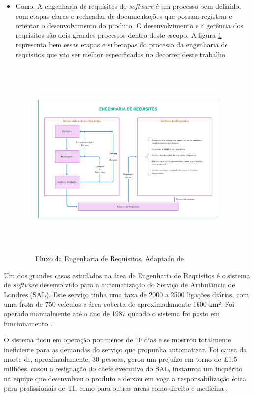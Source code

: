\begin{itemize}
    \item Como: A engenharia de requisitos de \textit{software} é um processo bem definido, com etapas claras e recheadas de documentações que possam registrar e orientar o desenvolvimento do produto. O desenvolvimento e a gerência dos requisitos são dois grandes processos dentro deste escopo. A figura \ref{eng_req_flux} representa bem essas etapas e subetapas do processo da engenharia de requisitos que vão ser melhor especificadas no decorrer deste trabalho.
    
    \begin{figure}[htb]
        \begin{center}
            \includegraphics[width=10cm,height=10cm,keepaspectratio]{figuras/Introducao/eng_req_fluxo.png}
            \caption{{Fluxo da Engenharia de Requisitos. Adaptado de \cite{westfall_5w2h}}}
            \label{eng_req_flux}
        \end{center}
    \end{figure}
    
\end{itemize}
    
Um dos grandes casos estudados na área de Engenharia de Requisitos é o sistema de \textit{software} desenvolvido para a automatização do Serviço de Ambulância de Londres (SAL). Este serviço tinha uma taxa de 2000 a 2500 ligações diárias, com uma frota de 750 veículos e área coberta de aproximadamente 1600 km². Foi operado manualmente até o ano de 1987 quando o sistema foi posto em funcionamento \cite{LodonFiasco}.

O sistema ficou em operação por menos de 10 dias e se mostrou totalmente ineficiente para as demandas do serviço que propunha automatizar. Foi causa da morte de, aproximadamente, 30 pessoas, gerou um prejuízo em torno de £1.5 milhões, casou a resignação do chefe executivo do SAL, instaurou um inquérito na equipe que desenvolveu o produto e deixou em voga a responsabilização ética para profissionais de TI, como para outras áreas como direito e medicina \cite{LodonFiasco}.

